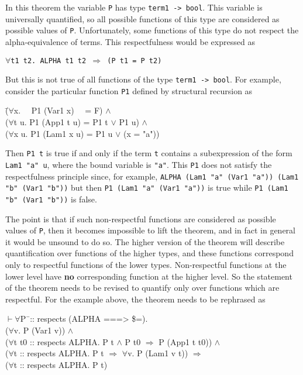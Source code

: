 \documentclass[envcountsame,runningheads]{llncs}
\begin{document}
In this theorem the variable {\tt P} has type {\tt term1 -> bool}.
This variable is universally quantified, so all possible functions of
this type are considered as possible values of {\tt P}.
Unfortunately, some functions of this type do not respect the
alpha-equivalence of terms.  This respectfulness would be expressed as
\begin{center}
{\tt $\forall$t1 t2. ALPHA t1 t2 $\Rightarrow$ (P t1 = P t2)}
\end{center}
But this is not true of all functions
of the type {\tt term1 -> bool}.
For example, consider the particular function {\tt P1} defined by
structural recursion as
{\tt \begin{tabbing}
\hspace{22.0mm}
       \=($\forall$x. \ \ P1 (Var1 x) \ \ = F) $\wedge$ \\
\>     ($\forall$t u. P1 (App1 t u) = P1 t $\vee$ P1 u) $\wedge$ \\
\>     ($\forall$x u. P1 (Lam1 x u) = P1 u $\vee$ (x = "a"))
\end{tabbing}}
Then {\tt P1 t} is true if and only if the term {\tt t} contains
a subexpression of the form {\tt Lam1 "a" u}, where the bound variable
is {\tt "a"}.  This {\tt P1} does not satisfy the respectfulness principle
since, for example, {\tt ALPHA (Lam1 "a" (Var1 "a")) (Lam1 "b" (Var1 "b"))}
but then {\tt P1 (Lam1 "a" (Var1 "a"))} is true while
{\tt P1~(Lam1 "b" (Var1 "b"))} is false.

The point is that if such non-respectful functions are considered as 
possible values of {\tt P}, then it becomes impossible to lift the
theorem, and in fact in general it would be unsound to do so. 
The higher version of the theorem will describe quantification over
functions of the higher types, and these functions correspond only to 
respectful functions of the lower types.  Non-respectful functions at the
lower level have
{\bf no} corresponding function at the higher level.  So the statement of the
theorem needs to be revised to quantify only over functions which are
respectful. 
For the example above, the theorem needs to be
rephrased
as
{\tt \begin{tabbing}
$\vdash \forall$P\=\ :: respects (ALPHA ===> \$=). \\
\>     ($\forall$v. P (Var1 v)) $\wedge$ \\
\>     ($\forall$t t0 :: respects ALPHA. P t $\wedge$ P t0 $\Rightarrow$ P (App1 t t0)) $\wedge$ \\
\>     ($\forall$t :: respects ALPHA. P t $\Rightarrow$ $\forall$v. P (Lam1 v t)) $\Rightarrow$ \\
\>     ($\forall$t :: respects ALPHA. P t)
\end{tabbing}}
\end{document}
